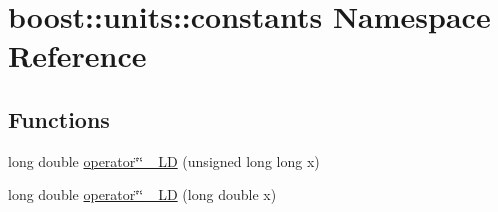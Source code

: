 \hypertarget{namespaceboost_1_1units_1_1constants}{}\section{boost\+:\+:units\+:\+:constants Namespace Reference}
\label{namespaceboost_1_1units_1_1constants}
\subsection*{Functions}
\begin{DoxyCompactItemize}
\item 
long double \hyperlink{namespaceboost_1_1units_1_1constants_a574260222fb41c463f65d727e71ea200}{operator\char`\"{}\char`\"{} \+\_\+\+LD} (unsigned long long x)
\item 
long double \hyperlink{namespaceboost_1_1units_1_1constants_a21be806b7651396a8d480e6e450292ab}{operator\char`\"{}\char`\"{} \+\_\+\+LD} (long double x)
\end{DoxyCompactItemize}
